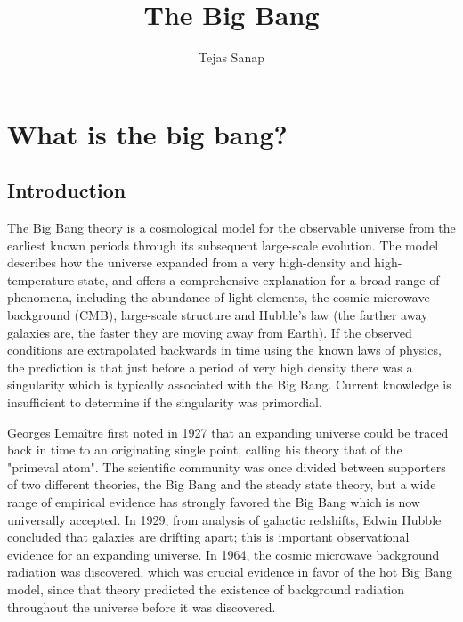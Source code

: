 \documentclass[14pt, oneside]{book}
\title{\large The Big Bang}
\author{Tejas Sanap}
\begin{document}
\frontmatter
	\maketitle
	\tableofcontents
	\listoffigures
	\listoftables
	\listoflistings

\mainmatter
	\chapter{What is the big bang?}
		\section{Introduction}
		The Big Bang theory is a cosmological model for the observable universe from the earliest known periods through its subsequent large-scale evolution\cite{2004biba.book.....S}. The model describes how the universe expanded from a very high-density and high-temperature state, and offers a comprehensive explanation for a broad range of phenomena, including the abundance of light elements, the cosmic microwave background (CMB), large-scale structure and Hubble's law (the farther away galaxies are, the faster they are moving away from Earth). If the observed conditions are extrapolated backwards in time using the known laws of physics, the prediction is that just before a period of very high density there was a singularity which is typically associated with the Big Bang. Current knowledge is insufficient to determine if the singularity was primordial.
		
		Georges Lemaître first noted in 1927 that an expanding universe could be traced back in time to an originating single point, calling his theory that of the "primeval atom". The scientific community was once divided between supporters of two different theories, the Big Bang and the steady state theory, but a wide range of empirical evidence has strongly favored the Big Bang which is now universally accepted\cite{kragh1999cosmology}. In 1929, from analysis of galactic redshifts, Edwin Hubble concluded that galaxies are drifting apart; this is important observational evidence for an expanding universe. In 1964, the cosmic microwave background radiation was discovered, which was crucial evidence in favor of the hot Big Bang model\cite{partridge20073k}, since that theory predicted the existence of background radiation throughout the universe before it was discovered.
		
\end{document}
